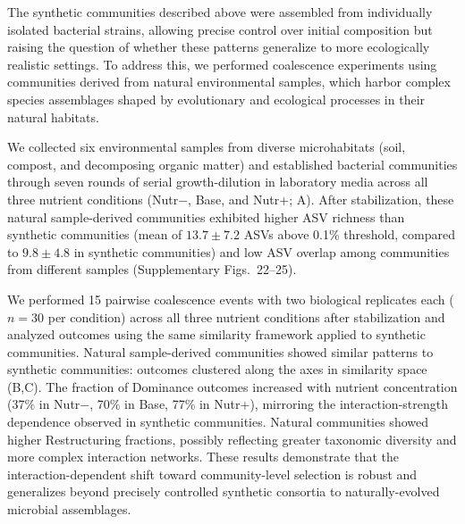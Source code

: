The synthetic communities described above were assembled from individually isolated bacterial strains, allowing precise control over initial composition but raising the question of whether these patterns generalize to more ecologically realistic settings. To address this, we performed coalescence experiments using communities derived from natural environmental samples, which harbor complex species assemblages shaped by evolutionary and ecological processes in their natural habitats.

We collected six environmental samples from diverse microhabitats (soil, compost, and decomposing organic matter) and established bacterial communities through seven rounds of serial growth-dilution in laboratory media across all three nutrient conditions (Nutr$-$, Base, and Nutr+; A). After stabilization, these natural sample-derived communities exhibited higher ASV richness than synthetic communities (mean of $13.7 \pm 7.2$ ASVs above 0.1\% threshold, compared to $9.8 \pm 4.8$ in synthetic communities) and low ASV overlap among communities from different samples (Supplementary Figs.~22–25).

We performed 15 pairwise coalescence events with two biological replicates each ($n = 30$ per condition) across all three nutrient conditions after stabilization and analyzed outcomes using the same similarity framework applied to synthetic communities. Natural sample-derived communities showed similar patterns to synthetic communities: outcomes clustered along the axes in similarity space (B,C). The fraction of Dominance outcomes increased with nutrient concentration (37\% in Nutr$-$, 70\% in Base, 77\% in Nutr+), mirroring the interaction-strength dependence observed in synthetic communities. Natural communities showed higher Restructuring fractions, possibly reflecting greater taxonomic diversity and more complex interaction networks. These results demonstrate that the interaction-dependent shift toward community-level selection is robust and generalizes beyond precisely controlled synthetic consortia to naturally-evolved microbial assemblages.

